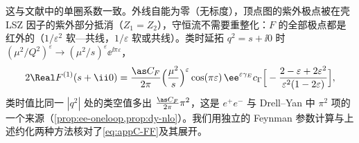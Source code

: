 这与文献中的单圈系数一致\cite{MochVermaserenVogt2005}。外线自能为零（无标度），顶点图的紫外极点被在壳 LSZ 因子的紫外部分抵消（$Z_1=Z_2$），守恒流不需要重整化：$F$ 的全部极点都是红外的（$1/\varepsilon^2$ 软—共线，$1/\varepsilon$ 软或共线）。类时延拓 $q^2=s+\ii0$ 时 $(\mu^2/Q^2)^\varepsilon\to(\mu^2/s)^\varepsilon\ee^{\ii\pi\varepsilon}$，
\begin{equation}\label{eq:appC-FFtime}
2\Real F^{(1)}(s+\ii0)=\frac{\as C_F}{2\pi}\Big(\frac{\mu^2}{s}\Big)^{\varepsilon}\cos(\pi\varepsilon)\,\ee^{\varepsilon\gamma_E}c_\Gamma\Big[-\frac{2-\varepsilon+2\varepsilon^2}{\varepsilon^2(1-2\varepsilon)}\Big] ,
\end{equation}
类时值比同一 $|q^2|$ 处的类空值多出 $\frac{\as C_F}{2\pi}\pi^2$，这是 $e^+e^-$ 与 Drell--Yan 中 $\pi^2$ 项的一个来源（\cref{prop:ee-oneloop,prop:dy-nlo}）。我们用独立的 Feynman 参数计算与上述约化两种方法核对了\cref{eq:appC-FF}及其展开。
